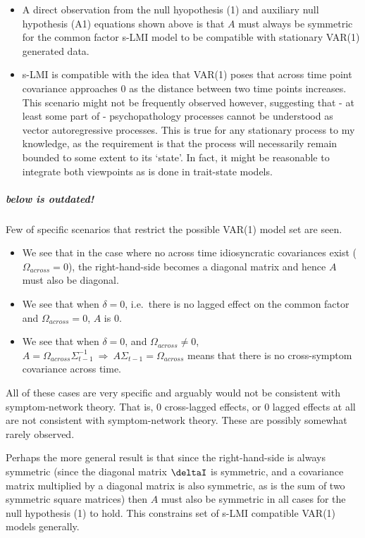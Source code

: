 \documentclass[
  letterpaper,
  DIV=11,
  numbers=noendperiod]{scrartcl}
\let\oldsubparagraph\subparagraph
\renewcommand{\subparagraph}[1]{\oldsubparagraph{#1}\mbox{}}
\begin{document}
\begin{itemize}
\item
  A direct observation from the null hyopothesis (1) and auxiliary null
  hypothesis (A1) equations shown above is that \(A\) must always be
  symmetric for the common factor s-LMI model to be compatible with
  stationary VAR(1) generated data.
\item
  s-LMI is compatible with the idea that VAR(1) poses that across time
  point covariance approaches 0 as the distance between two time points
  increases. This scenario might not be frequently observed however,
  suggesting that - at least some part of - psychopathology processes
  cannot be understood as vector autoregressive processes. This is true
  for any stationary process to my knowledge, as the requirement is that
  the process will necessarily remain bounded to some extent to its
  `state'. In fact, it might be reasonable to integrate both viewpoints
  as is done in trait-state models.
\end{itemize}

\hypertarget{below-is-outdated}{%
\subparagraph{below is outdated!}\label{below-is-outdated}}

Few of specific scenarios that restrict the possible VAR(1) model set
are seen.

\begin{itemize}
\item
  We see that in the case where no across time idiosyncratic covariances
  exist (\(\Omega_{across} = 0\)), the right-hand-side becomes a
  diagonal matrix and hence \(A\) must also be diagonal.
\item
  We see that when \(\delta=0\), i.e.~there is no lagged effect on the
  common factor and \(\Omega_{across} = 0\), \(A\) is 0.
\item
  We see that when \(\delta=0\), and \(\Omega_{across}\ne0\),
  \(A=\Omega_{across}\Sigma_{t-1}^{-1}\:\Longrightarrow\: A\Sigma_{t-1}=\Omega_{across}\)
  means that there is no cross-symptom covariance across time.
\end{itemize}

All of these cases are very specific and arguably would not be
consistent with symptom-network theory. That is, 0 cross-lagged effects,
or 0 lagged effects at all are not consistent with symptom-network
theory. These are possibly somewhat rarely observed.

Perhaps the more general result is that since the right-hand-side is
always symmetric (since the diagonal matrix \(\deltaI\) is symmetric,
and a covariance matrix multiplied by a diagonal matrix is also
symmetric, as is the sum of two symmetric square matrices) then \(A\)
must also be symmetric in all cases for the null hypothesis (1) to hold.
This constrains set of s-LMI compatible VAR(1) models generally.
\end{document}
